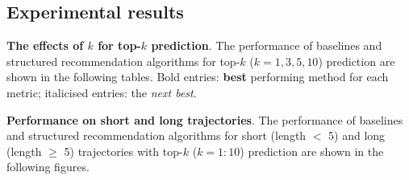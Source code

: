
\clearpage
\subsection{Experimental results}

\textbf{The effects of $k$ for top-$k$ prediction}.
The performance of baselines and structured recommendation algorithms for top-$k$ ($k=1,3,5,10$) 
prediction are shown in the following tables.
Bold entries: \textbf{best} performing method for each metric; italicised entries: the \textit{next best}. 




\clearpage

\textbf{Performance on short and long trajectories}.
The performance of baselines and structured recommendation algorithms 
for short (length $<$ 5) and long (length $\ge$ 5) trajectories 
with top-$k$ ($k=1:10$) prediction are shown in the following figures.

%

